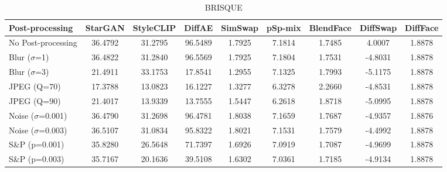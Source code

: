 \documentclass{article}
\begin{document}
\begin{table}[h!]
\begin{subtable}{\textwidth}
\caption{BRISQUE}
\centering
\scriptsize
\begin{tabular}{lcccccccc}
\toprule
\textbf{Post-processing} & StarGAN & StyleCLIP & DiffAE & SimSwap & pSp-mix & BlendFace & DiffSwap & DiffFace \\
\midrule
No Post-processing & 36.4792 & 31.2795 & 96.5489 & 1.7925 & 7.1814 & 1.7485 & 4.0007 & 1.8878\\
\midrule
Blur ($\sigma$=1) & 36.4822 & 31.2840 & 96.5569 & 1.7925 & 7.1804 & 1.7531 & -4.8031 & 1.8878\\
Blur ($\sigma$=3) & 21.4911 & 33.1753 & 17.8541 & 1.2955 & 7.1325 & 1.7993 & -5.1175 & 1.8878\\
JPEG (Q=70) & 17.3788 & 13.0823 & 16.1227 & 1.3277 & 6.3278 & 2.2660 & -4.8531 & 1.8878 \\
JPEG (Q=90) & 21.4017 & 13.9339 & 13.7555 & 1.5447 & 6.2618 & 1.8718 & -5.0995 & 1.8878\\
Noise ($\sigma$=0.001) & 36.4790 & 31.2698 & 96.4781 & 1.8038 & 7.1659 & 1.7687 & -4.9357 & 1.8876\\
Noise ($\sigma$=0.003) & 36.5107 & 31.0834 & 95.8322 & 1.8021 & 7.1531 & 1.7579 & -4.4992 & 1.8878\\
S\&P (p=0.001) & 35.8280 & 26.5648 & 71.7397 & 1.6926 & 7.0919 & 1.7087 & -4.9699 & 1.8878\\
S\&P (p=0.003) & 35.7167 & 20.1636 & 39.5108 & 1.6302 & 7.0361 & 1.7185 & -4.9134 & 1.8878\\
\bottomrule
\end{tabular}
\end{subtable}

\end{table}

\clearpage
\end{document}
